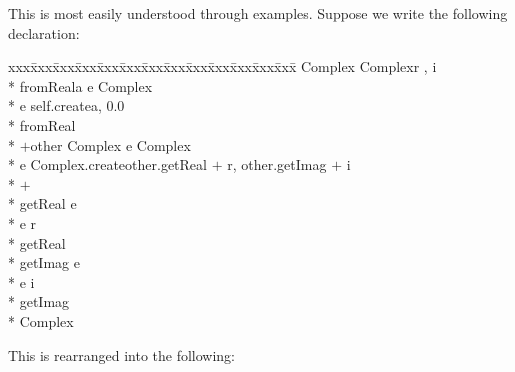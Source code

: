 This is most easily understood through examples.  Suppose we write the
following declaration:

{\small\it\begin{minipage}{\textwidth}\begin{tabbing}
xxx\=xxx\=xxx\=xxx\=xxx\=xxx\=xxx\=xxx\=xxx\=xxx\=xxx\=xxx\=xxx\=\+\kill%
 Complex \assign{}   Complex\/\LB{}r \CO{} , i \CO{} \/\RB{}\+\\*{}%
     fromReal\/\LB{}a \CO{} \/\RB{} \returns{} \/\LB{}e \CO{} Complex\/\RB{}\+\\*{}%
    e \assign{} self.create\/\LB{}a, 0.0\/\RB{}\-\\*{}%
   fromReal\\*{}%
    $+$\/\LB{}other \CO{} Complex\/\RB{} \returns{} \/\LB{}e \CO{} Complex\/\RB{}\+\\*{}%
    e \assign{} Complex.create\/\LB{}other.getReal $+$ r, other.getImag $+$ i\/\RB{}\-\\*{}%
   $+$\\*{}%
    getReal \returns{} \/\LB{}e \CO{} \/\RB{}\+\\*{}%
    e \assign{} r\-\\*{}%
   getReal\\*{}%
    getImag \returns{} \/\LB{}e \CO{} \/\RB{}\+\\*{}%
    e \assign{} i\-\\*{}%
   getImag\-\\*{}%
 Complex
\end{tabbing}\end{minipage}}

This is rearranged into the following:

